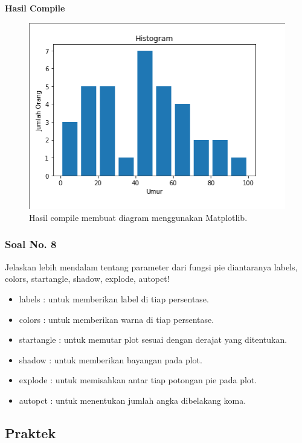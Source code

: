 

\hfill \break
\textbf{Hasil Compile}

\begin{figure}[H]
	\includegraphics[width=12cm]{figures/6/1174089/Teori/histogram.png}
	\centering
	\caption{Hasil compile membuat diagram menggunakan Matplotlib.}
\end{figure}

\subsubsection{Soal No. 8}
\hfill \break
 Jelaskan lebih mendalam tentang parameter dari fungsi pie diantaranya labels, colors, startangle, shadow, explode, autopct!
 
 \begin{itemize}
 	\item labels : untuk memberikan label di tiap persentase.
 	\item colors : untuk memberikan warna di tiap persentase.
 	\item startangle : untuk memutar plot sesuai dengan derajat yang ditentukan.
 	\item shadow : untuk memberikan bayangan pada plot.
 	\item explode : untuk memisahkan antar tiap potongan pie pada plot.
 	\item autopct : untuk menentukan jumlah angka dibelakang koma.
 \end{itemize}

\subsection{Praktek}
